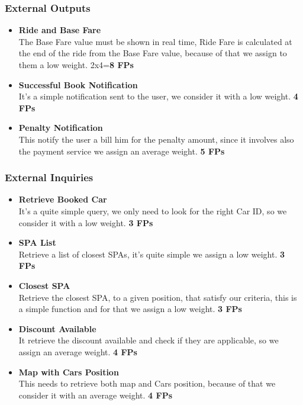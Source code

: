 \subsubsection{External Outputs}
\begin{itemize}
    \item \textbf{Ride and Base Fare}\\
    The Base Fare value must be shown in real time, Ride Fare is calculated at the end of the ride from the Base Fare value, because of that we assign to them a low weight.
    \hfill
    2x4=\textbf{8 FPs}
    
    \item \textbf{Successful Book Notification}\\
    It's a simple notification sent to the user, we consider it with a low weight.
    \hfill
    \textbf{4 FPs}
    
    \item \textbf{Penalty Notification}\\
    This notify the user a bill him for the penalty amount, since it involves also the payment service we assign an average weight.
    \hfill
    \textbf{5 FPs}
    
\end{itemize}


\subsubsection{External Inquiries}
\begin{itemize}
    \item \textbf{Retrieve Booked Car}\\
    It's a quite simple query, we only need to look for the right Car ID, so we consider it with a low weight.
    \hfill
    \textbf{3 FPs}
    
    \item \textbf{SPA List}\\
    Retrieve a list of closest SPAs, it's quite simple we assign a low weight.
    \hfill
    \textbf{3 FPs}
    
    \item \textbf{Closest SPA}\\
    Retrieve the closest SPA, to a given position, that satisfy our criteria, this is a simple function and for that we assign a low weight.
    \hfill
    \textbf{3 FPs}
    
    \item \textbf{Discount Available}\\
    It retrieve the discount available and check if they are applicable, so we assign an average weight.
    \hfill
    \textbf{4 FPs}
    
    \item \textbf{Map with Cars Position}\\
    This needs to retrieve both map and Cars position, because of that we consider  it with an average weight.
    \hfill
    \textbf{4 FPs}
\end{itemize}


